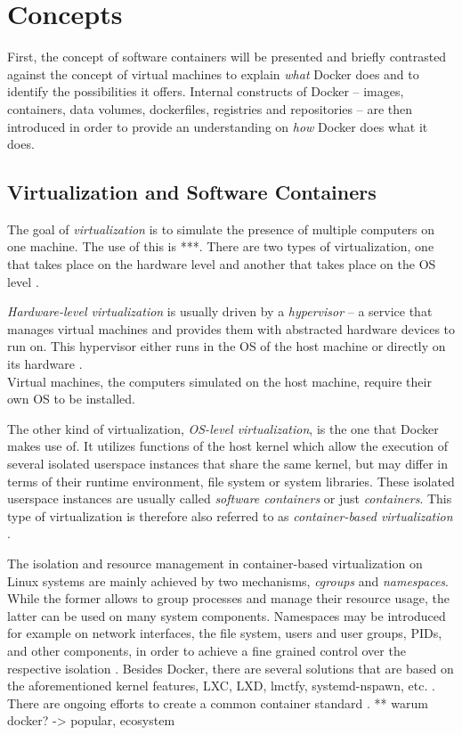 
\section{Concepts} %
\label{sec:docker_concepts}

  First, the concept of software containers will be presented and briefly contrasted against the concept of virtual machines to explain \emph{what} Docker does and to identify the possibilities it offers. Internal constructs of Docker -- images, containers, data volumes, dockerfiles, registries and repositories -- are then introduced in order to provide an understanding on \emph{how} Docker does what it does.

  \subsection{Virtualization and Software Containers} %
  \label{sub:virtualization_and_software_containers}
    The goal of \emph{virtualization} is to simulate the presence of multiple computers on one machine. The use of this is ***. There are two types of virtualization, one that takes place on the hardware level and another that takes place on the \ac{OS} level \cite{Ruiz2015Performance}.

    \emph{Hardware-level virtualization} is usually driven by a \emph{hypervisor} -- a service that manages virtual machines and provides them with abstracted hardware devices to run on. This hypervisor either runs in the OS of the host machine or directly on its hardware \cite{Ruiz2015Performance}. \\
    Virtual machines, \ie the computers simulated on the host machine, require their own OS to be installed.

    The other kind of virtualization, \emph{OS-level virtualization}, is the one that Docker makes use of.
    It utilizes functions of the host kernel which allow the execution of several isolated userspace instances that share the same kernel, but may differ in terms of their runtime environment, \eg file system or system libraries. These isolated userspace instances are usually called \emph{software containers} or just \emph{containers}. This type of virtualization is therefore also referred to as \emph{container-based virtualization} \cite{Ruiz2015Performance}.

    The isolation and resource management in container-based virtualization on Linux systems are mainly achieved by two mechanisms, \emph{\ac{cgroups}} and \emph{namespaces}. While the former allows to group processes and manage their resource usage, the latter can be used on many system components. Namespaces may be introduced for example on network interfaces, the file system, users and user groups, \acp{PID}, and other components, in order to achieve a fine grained control over the respective isolation \cite{Ruiz2015Performance}.
    Besides Docker, there are several solutions that are based on the aforementioned kernel features, \eg LXC, LXD, lmctfy, systemd-nspawn, etc. \cite{Ruiz2015Performance}. There are ongoing efforts to create a common container standard \cite{Initiative????Open}.
    ** warum docker? -> popular, ecosystem


